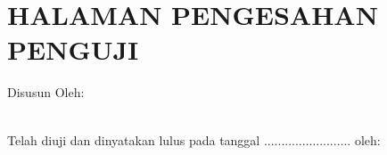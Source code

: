 % 

% 

\chapter*{HALAMAN PENGESAHAN PENGUJI}

\vspace*{0.4cm}
\noindent

\noindent
\begin{center}
  \vspace*{2cm}

  Disusun Oleh:\\
  \underline{\penulis}\\
  \nim
  \vspace*{2cm}

  Telah diuji dan dinyatakan lulus pada tanggal ......................... oleh:\\
  \vspace*{2cm}

  \\
  \vspace*{1cm}
\end{center}